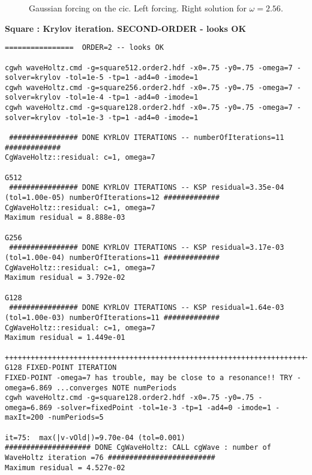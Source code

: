 \documentclass[preprint,11pt]{elsarticle}
\begin{document}
{%
%
\newcommand{\figWidth}{6cm}%
\newcommand{\trimfig}[2]{\trimhb{#1}{#2}{.0}{.0}{.0}{.0}}
\begin{figure}[htb]
\begin{center}
\end{center}
\caption{Gaussian forcing on the cic. Left forcing. Right solution for $\omega=2.56$. }
  \label{fig:gaussianForcingCIC}
\end{figure}
}


\bigskip
\textbf{Square  : Krylov iteration. SECOND-ORDER  - looks OK}
\begin{Verbatim}[fontsize=\scriptsize]
================  ORDER=2 -- looks OK 

cgwh waveHoltz.cmd -g=square512.order2.hdf -x0=.75 -y0=.75 -omega=7 -solver=krylov -tol=1e-5 -tp=1 -ad4=0 -imode=1
cgwh waveHoltz.cmd -g=square256.order2.hdf -x0=.75 -y0=.75 -omega=7 -solver=krylov -tol=1e-4 -tp=1 -ad4=0 -imode=1
cgwh waveHoltz.cmd -g=square128.order2.hdf -x0=.75 -y0=.75 -omega=7 -solver=krylov -tol=1e-3 -tp=1 -ad4=0 -imode=1

 ################ DONE KYRLOV ITERATIONS -- numberOfIterations=11 #############
CgWaveHoltz::residual: c=1, omega=7

G512
 ################ DONE KYRLOV ITERATIONS -- KSP residual=3.35e-04 (tol=1.00e-05) numberOfIterations=12 #############
CgWaveHoltz::residual: c=1, omega=7
Maximum residual = 8.888e-03

G256
 ################ DONE KYRLOV ITERATIONS -- KSP residual=3.17e-03 (tol=1.00e-04) numberOfIterations=11 #############
CgWaveHoltz::residual: c=1, omega=7
Maximum residual = 3.792e-02

G128
 ################ DONE KYRLOV ITERATIONS -- KSP residual=1.64e-03 (tol=1.00e-03) numberOfIterations=11 #############
CgWaveHoltz::residual: c=1, omega=7
Maximum residual = 1.449e-01

++++++++++++++++++++++++++++++++++++++++++++++++++++++++++++++++++++++++++++++++++++++++++++++++++++++++++++++++++++++++++++++
G128 FIXED-POINT ITERATION
FIXED-POINT -omega=7 has trouble, may be close to a resonance!! TRY -omega=6.869 ...converges NOTE numPeriods
cgwh waveHoltz.cmd -g=square128.order2.hdf -x0=.75 -y0=.75 -omega=6.869 -solver=fixedPoint -tol=1e-3 -tp=1 -ad4=0 -imode=1 -maxIt=200 -numPeriods=5

it=75:  max(|v-vOld|)=9.70e-04 (tol=0.001)
#################### DONE CgWaveHoltz: CALL cgWave : number of WaveHoltz iteration =76 #########################
Maximum residual = 4.527e-02

\end{Verbatim}
\end{document}
